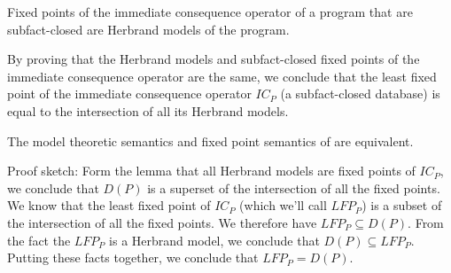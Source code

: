 \begin{lemma}
Fixed points of the immediate consequence operator of a \core{} program that are subfact-closed are Herbrand models of the program.    
\end{lemma}


By proving that the Herbrand models and subfact-closed fixed points of
the immediate consequence operator are the same, we conclude that the
least fixed point of the immediate consequence operator
$\textit{IC}_P$ (a subfact-closed database) is equal to the
intersection of all its Herbrand models.

\begin{theorem}
The model theoretic semantics and fixed point semantics of \core{} are equivalent.
\end{theorem}

Proof sketch: Form the lemma that all Herbrand models are fixed points of $\textit{IC}_P$, we conclude that $D(P)$ is a superset of the intersection of all the fixed points. We know that the least fixed point of $\textit{IC}_P$ (which we'll call $\textit{LFP}_P$) is a subset of the intersection of all the fixed points. We therefore have $\textit{LFP}_P \subseteq D(P)$. From the fact the $\textit{LFP}_P$ is a Herbrand model, we conclude that $D(P) \subseteq \textit{LFP}_P$. Putting these facts together, we conclude that $\textit{LFP}_P = D(P)$.




